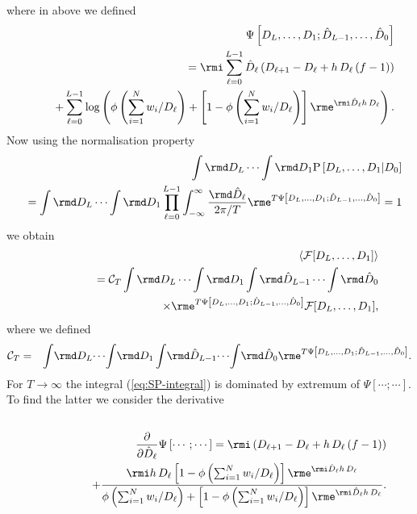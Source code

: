 \documentclass[10pt]{iopart}
\newcommand{\1}{\mathbf{1}}
\newcommand{\Prob}{\mathrm{P}}
\begin{document}
%
where in above we defined 
%
\begin{eqnarray}
&&\Psi\left[D_{L},\ldots,D_{1};\hat{D}_{L-1},\ldots,\hat{D}_0\right]\nonumber\\
%
&&~~~=\rmi \sum_{\ell=0}^{L-1}\hat{D}_\ell\left(D_{\ell+1}- D_{\ell}+ h\,D_{\ell}\left(f- 1\right)\right)\nonumber\\
&&~~~~~+\sum_{\ell=0}^{L-1}\log\left( \phi\left(\sum_{i=1}^Nw_i/D_\ell\right)+\left[1-\phi\left(\sum_{i=1}^Nw_i/D_\ell\right)\right]\rme^{\rmi \hat{D}_\ell h\,D_{\ell}}\right)\label{def:Psi}.
%
\end{eqnarray}
%
Now using the normalisation property 
%
\begin{eqnarray}
%
&&\int\rmd D_{L}\cdots\int\rmd D_{1}\Prob\left[D_{L},\ldots,D_{1}\vert D_{0}\right]\nonumber\\
%
&&=\int\rmd D_{L}\cdots\int\rmd D_{1}\prod_{\ell=0}^{L-1}\int_{-\infty}^{\infty}\frac{\rmd\hat{D}_\ell}{2\pi/T}\rme^{T\Psi\left[D_{L},\ldots,D_{1};\hat{D}_{L-1},\ldots,\hat{D}_0\right]} =1
%
\end{eqnarray}
%
we obtain
%
\begin{eqnarray}
&&\langle\mathcal{F}[D_{L},\ldots,D_{1}]\rangle\nonumber\\
%
&&~~~~~~~~~~~~=\mathcal{C}_T\int\rmd D_{L}\cdots\int\rmd D_{1}\int\rmd \hat{D}_{L-1}\cdots\int\rmd \hat{D}_{0}\nonumber\\
 &&~~~~~~~~~~~~~~~~~\times\rme^{T\Psi\left[D_{L},\ldots,D_{1};\hat{D}_{L-1},\ldots,\hat{D}_0\right]}\mathcal{F}[D_{L},\ldots,D_{1}]\label{eq:SP-integral},
%
\end{eqnarray}
%
where we defined
%
\begin{eqnarray}
%
\mathcal{C}_T&=&\int\!\rmd D_{L}\!\cdots\!\int\!\rmd D_{1}\int\!\rmd \hat{D}_{L-1}\!\cdots\!\int\!\rmd \hat{D}_{0} \rme^{T\Psi\left[D_{L},\ldots,D_{1};\hat{D}_{L-1},\ldots,\hat{D}_0\right]}.
%
\end{eqnarray}
%
For $T\to\infty$ the integral (\ref{eq:SP-integral}) is dominated by extremum of $\Psi\left[\cdots;\cdots\right]$. To find the latter we consider the derivative
%
\begin{eqnarray}
&&\nonumber\\
%
&&\frac{\partial}{\partial \hat{D}_\ell}\Psi\left[\cdots;\cdots\right]=\rmi \left(D_{\ell+1}- D_{\ell}+ h\,D_{\ell}\left(f- 1\right)\right)\nonumber\\
&&~~~~~~~~~~~~~+ \frac{\rmi h\,D_{\ell}\left[1-\phi\left(\sum_{i=1}^Nw_i/D_\ell\right)\right]\rme^{\rmi \hat{D}_\ell h\,D_{\ell}}}{\phi\left(\sum_{i=1}^Nw_i/D_\ell\right)+\left[1-\phi\left(\sum_{i=1}^Nw_i/D_\ell\right)\right]\rme^{\rmi \hat{D}_\ell h\,D_{\ell}}}\label{eq:Psi-der-D-hat}.
%
\end{eqnarray}
\end{document}
